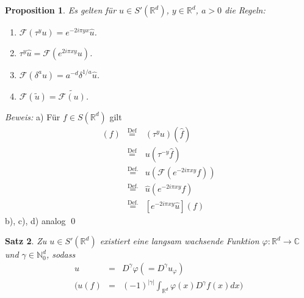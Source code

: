 \documentclass[12pt]{extreport} %
\newtheorem{Satz}{Satz}[subsection]
\newtheorem{Prop}[Satz]{Proposition}
\numberwithin{equation}{section}
\newcommand{\C}{\mathbb{C}} %
\newcommand{\R}{\mathbb{R}} %
\newcommand{\N}{\mathbb{N}} %
\newcommand{\f}{\hat{f}}
\newcommand{\F}{\mathcal{F}}
\newcommand{\Bew}{\emph{Beweis: }}
\begin{document}
	\begin{Prop}
		Es gelten für $u\in S'(\R^d)$, $y\in \R^d$, $a>0$ die Regeln:
		\begin{enumerate}
			\item[a)] $\F(\tau^y u) = e^{-2i\pi y x} \hat{u}$.
			\item[b)] $\tau^y \hat u =\F(e^{2i\pi x y} u)$.
			\item[c)] $\F(\delta^a u) = a^{-d}\delta^{1/a} \hat u$.
			\item[d)] $\F(\tilde{u}) = \widetilde{\F(u)}$.
		\end{enumerate}
	\end{Prop}
	
	\Bew a) Für $f\in S(\R^d)$ gilt
	\begin{eqnarray}
		[F(\tau^y u)](f) &\overset{\text{Def}}{=}& (\tau^y u)(\f)\nonumber\\
		&\overset{\text{Def}}{=}& u(\tau^{-y}\f)\nonumber\\
		&\overset{\text{Def.}}{=}& u(\F(e^{-2i\pi xy}f))\nonumber\\
		&\overset{\text{Def.}}{=}& \hat u (e^{-2i\pi xy}f)\nonumber\\
		&\overset{\text{Def.}}{=}& [e^{-2i\pi xy}\hat u](f)\nonumber
	\end{eqnarray}
	b), c), d) analog
	\qed
	
	\begin{Satz}
		Zu $u\in S'(\R^d)$ existiert eine langsam wachsende Funktion $\varphi:\R^d\rightarrow \C$ und $\gamma\in \N_0^d$, sodass
		\begin{eqnarray}
			u &=& D^\gamma\varphi (= D^\gamma u_\varphi)\nonumber\\
			( u(f) &=& (-1)^{|\gamma|}\int_{\R^d}\varphi(x) D^{\gamma} f(x)dx ) \nonumber
		\end{eqnarray}
	\end{Satz}
	
\end{document}
